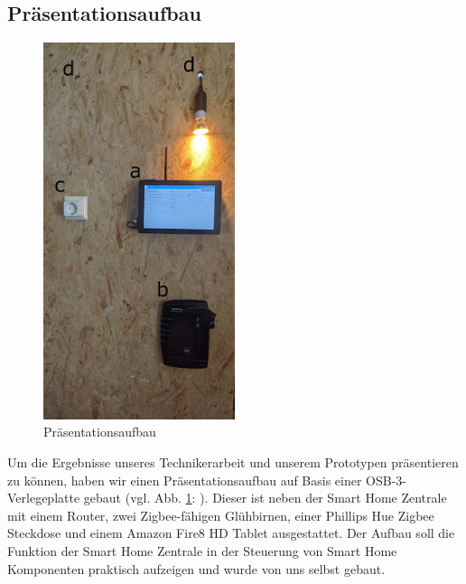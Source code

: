 \subsection{Präsentationsaufbau}\label{hw_testaufbau}
\begin{figure}[H]
    \includegraphics[width=0.5\textwidth]{img/t1.jpg}
    \caption[Präsentationsaufbau]{Präsentationsaufbau}
    \label{fig:praesentationsaufbau}
\end{figure}
Um die Ergebnisse unseres Technikerarbeit und unserem Prototypen präsentieren zu können, haben wir einen Präsentationsaufbau auf Basis einer OSB-3-Verlegeplatte gebaut (vgl. Abb. \ref{fig:praesentationsaufbau}: ).
Dieser ist neben der Smart Home Zentrale mit einem Router, zwei Zigbee-fähigen Glühbirnen, einer Phillips Hue Zigbee Steckdose und einem Amazon Fire8 HD Tablet ausgestattet.
Der Aufbau soll die Funktion der Smart Home Zentrale in der Steuerung von Smart Home Komponenten praktisch aufzeigen und wurde von uns selbst gebaut.
